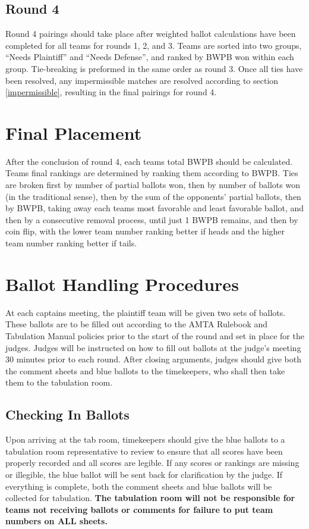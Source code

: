 \documentclass{article}
\begin{document}
\subsection{Round 4}
Round 4 pairings should take place after weighted ballot calculations have been completed for all teams for rounds 1, 2, and 3.  Teams are sorted into two groups, ``Needs Plaintiff'' and ``Needs Defense'', and ranked by BWPB won within each group.  Tie-breaking is preformed in the same order as round 3.  Once all ties have been resolved, any impermissible matches are resolved according to section \ref{impermissible}, resulting in the final pairings for round 4.
\section{Final Placement}
After the conclusion of round 4, each teams total BWPB should be calculated.  Teams final rankings are determined by ranking them according to BWPB.  Ties are broken first by number of partial ballots won, then by number of ballots won (in the traditional sense), then by the sum of the opponents' partial ballots, then by BWPB, taking away each teams most favorable and least favorable ballot, and then by a consecutive removal process, until just 1 BWPB remains, and then by coin flip, with the lower team number ranking better if heads and the higher team number ranking better if tails.
\section{Ballot Handling Procedures}
At each captains meeting, the plaintiff team will be given two sets of ballots.  These ballots are to be filled out according to the AMTA Rulebook and Tabulation Manual policies prior to the start of the round and set in place for the judges.  Judges will be instructed on how to fill out ballots at the judge's meeting 30 minutes prior to each round.  After closing arguments, judges should give both the comment sheets and blue ballots to the timekeepers, who shall then take them to the tabulation room.
\subsection{Checking In Ballots}
Upon arriving at the tab room, timekeepers should give the blue ballots to a tabulation room representative to review to ensure that all scores have been properly recorded and all scores are legible.  If any scores or rankings are missing or illegible, the blue ballot will be sent back for clarification by the judge.  If everything is complete, both the comment sheets and blue ballots will be collected for tabulation.  \textbf{The tabulation room will not be responsible for teams not receiving ballots or comments for failure to put team numbers on ALL sheets.}
\end{document}
